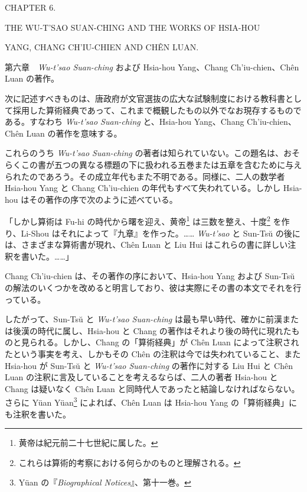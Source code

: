 \documentclass[11pt]{article}
\newcommand{\scanpage}[2]{\clearpage\setcounter{footnote}{0}\noindent{\footnotesize\color{gray}PDF #1 頁 · #2}\par\medskip}
\newcommand{\scanfooter}{}
\begin{document}
\scanpage{0051}{第六章、印刷頁37}
\begin{center}
CHAPTER 6.\par
\medskip
THE WU-T'SAO SUAN-CHING AND THE WORKS OF HSIA-HOU\par
YANG, CHANG CH'IU-CHIEN AND CHÊN LUAN.\par
\medskip
第六章　\emph{Wu-t'sao Suan-ching} および Hsia-hou Yang、Chang Ch'iu-chien、Chên Luan の著作。
\end{center}

次に記述すべきものは、唐政府が文官選抜の広大な試験制度における教科書として採用した算術経典であって、これまで概観したもの以外でなお現存するものである。すなわち \emph{Wu-t'sao Suan-ching} と、Hsia-hou Yang、Chang Ch'iu-chien、Chên Luan の著作を意味する。

これらのうち \emph{Wu-t'sao Suan-ching} の著者は知られていない。この題名は、おそらくこの書が五つの異なる標題の下に扱われる五巻または五章を含むために与えられたのであろう。その成立年代もまた不明である。同様に、二人の数学者 Hsia-hou Yang と Chang Ch'iu-chien の年代もすべて失われている。しかし Hsia-hou はその著作の序で次のように述べている。

「しかし算術は Fu-hi の時代から曙を迎え、黄帝\footnote{黄帝は紀元前二十七世紀に属した。} は三数を整え、十度\footnote{これらは算術的考察における何らかのものと理解される。} を作り、Li-Shou はそれによって『九章』を作った。…… \emph{Wu-t'sao} と Sun-Tsŭ の後には、さまざまな算術書が現れ、Chên Luan と Liu Hui はこれらの書に詳しい注釈を書いた。……」

Chang Ch'iu-chien は、その著作の序において、Hsia-hou Yang および Sun-Tsŭ の解法のいくつかを改めると明言しており、彼は実際にその書の本文でそれを行っている。

したがって、Sun-Tsŭ と \emph{Wu-t'sao Suan-ching} は最も早い時代、確かに前漢または後漢の時代に属し、Hsia-hou と Chang の著作はそれより後の時代に現れたものと見られる。しかし、Chang の「算術経典」が Chên Luan によって注釈されたという事実を考え、しかもその Chên の注釈は今では失われていること、また Hsia-hou が Sun-Tsŭ と \emph{Wu-t'sao Suan-ching} の著作に対する Liu Hui と Chên Luan の注釈に言及していることを考えるならば、二人の著者 Hsia-hou と Chang は疑いなく Chên Luan と同時代人であったと結論しなければならない。さらに Yüan Yüan\footnote{Yüan の『\emph{Biographical Notices}』、第十一巻。} によれば、Chên Luan は Hsia-hou Yang の「算術経典」にも注釈を書いた。
\scanfooter
\end{document}
